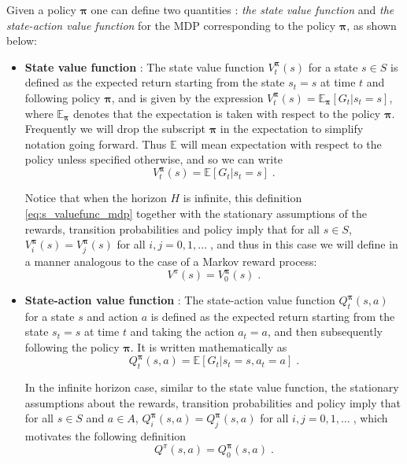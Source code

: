 \documentclass{article}
\theoremstyle{definition}
\theoremstyle{remark}
\newcommand{\E}{\mathbb{E}}                                        %
\begin{document}
Given a policy $\bm{\pi}$ one can define two quantities : \textit{the state value function} and \textit{the state-action value function} for the MDP corresponding to the policy $\bm{\pi}$, as shown below:

\begin{itemize}
\item \textbf{State value function} : The state value function $V^{\bm{\pi}}_t(s)$ for a state $s \in S$ is defined as the expected return starting from the state $s_t=s$ at time $t$ and following policy $\bm{\pi}$, and is given by the expression $V^{\bm{\pi}}_t(s) = \E_{\bm{\pi}}[G_t|s_t = s]$, where $\E_{\bm{\pi}}$ denotes that the expectation is taken with respect to the policy $\bm{\pi}$. Frequently we will drop the subscript $\bm{\pi}$ in the expectation to simplify notation going forward. Thus $\E$ will mean expectation with respect to the policy unless specified otherwise, and so we can write
\begin{equation}
V^{\bm{\pi}}_t(s) = \E [G_t|s_t = s] \;.
\label{eq:s_valuefunc_mdp}
\end{equation}

Notice that when the horizon $H$ is infinite, this definition \eqref{eq:s_valuefunc_mdp} together with the stationary assumptions of the rewards, transition probabilities and policy imply that for all $s \in S$, $V^{\bm{\pi}}_i(s) = V^{\bm{\pi}}_j(s)$ for all $i,j = 0,1,\dots \;$, and thus in this case we will define in a manner analogous to the case of a Markov reward process:
\begin{equation}
V^{\pi}(s) = V^{\bm{\pi}}_0(s) \;.
\label{eq:s_valuefunc_mdp_infinite}
\end{equation}

\item \textbf{State-action value function} : The state-action value function $Q^{\bm{\pi}}_t(s,a)$ for a state $s$ and action $a$ is defined as the expected return starting from the state $s_t=s$ at time $t$ and taking the action $a_t=a$, and then subsequently following the policy $\bm{\pi}$. It is written mathematically as
\begin{equation}
Q^{\bm{\pi}}_t(s,a) = \E [G_t|s_t = s, a_t = a] \;.
\label{eq:sa_valuefunc_mdp}
\end{equation}

In the infinite horizon case, similar to the state value function, the stationary assumptions about the rewards,  transition probabilities and policy imply that for all $s \in S$ and $a \in A$, $Q^{\bm{\pi}}_i(s,a) = Q^{\bm{\pi}}_j(s,a)$ for all $i,j = 0,1,\dots \;$, which motivates the following definition
\begin{equation}
Q^{\pi}(s,a) = Q^{\bm{\pi}}_0(s,a) \;.
\label{eq:sa_valuefunc_mdp_infinite}
\end{equation}
\end{itemize}
\end{document}
